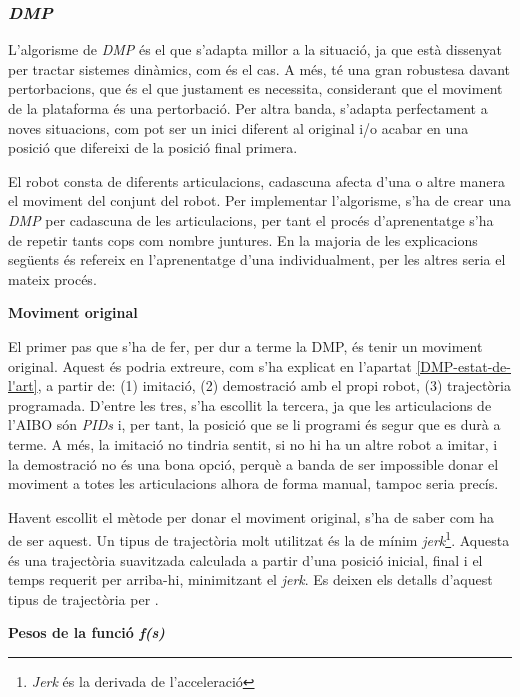 \documentclass[12pt,a4paper,final,twoside]{article}
\begin{document}
\subsubsection{\textit{DMP}}
\label{DMP-estudis-preliminars}

L'algorisme de \textit{DMP} és el que s'adapta millor a la situació, ja que està dissenyat per tractar sistemes dinàmics, com és el cas. A més, té una gran robustesa davant pertorbacions, que és el que justament es necessita, considerant que el moviment de la plataforma és una pertorbació. Per altra banda, s'adapta perfectament a noves situacions, com pot ser un inici diferent al original i/o acabar en una posició que difereixi de la posició final primera.

El robot consta de diferents articulacions, cadascuna afecta d'una o altre manera el moviment del conjunt del robot. Per implementar l'algorisme, s'ha de crear una \textit{DMP} per cadascuna de les articulacions, per tant el procés d'aprenentatge s'ha de repetir tants cops com nombre juntures. En la majoria de les explicacions següents és refereix en l'aprenentatge d'una individualment, per les altres seria el mateix procés.

\vspace{20pt}
\textbf{Moviment original}

El primer pas que s'ha de fer, per dur a terme la DMP, és tenir un moviment original. Aquest és podria extreure, com s'ha explicat en l'apartat \ref{DMP-estat-de-l'art}, a partir de: (1) imitació, (2) demostració amb el propi robot, (3) trajectòria programada. D'entre les tres, s'ha escollit la tercera, ja que les articulacions de l'AIBO són \textit{PIDs} i, per tant, la posició que se li programi és segur que es durà a terme. A més, la imitació no tindria sentit, si no hi ha un altre robot a imitar, i la demostració no és una bona opció, perquè a banda de ser impossible donar el moviment a totes les articulacions alhora de forma manual, tampoc seria precís.

Havent escollit el mètode per donar el moviment original, s'ha de saber com ha de ser aquest. Un tipus de trajectòria molt utilitzat és la de mínim \textit{jerk}\footnote{\textit{Jerk} és la derivada de l'acceleració}. Aquesta és una trajectòria suavitzada calculada a partir d'una posició inicial, final i el temps requerit per arriba-hi, minimitzant el \textit{jerk}. Es deixen els detalls d'aquest tipus de trajectòria per \cite{Shadmehr2004}.

\vspace{20pt}
\textbf{Pesos de la funció \textit{f(s)}}
\end{document}
